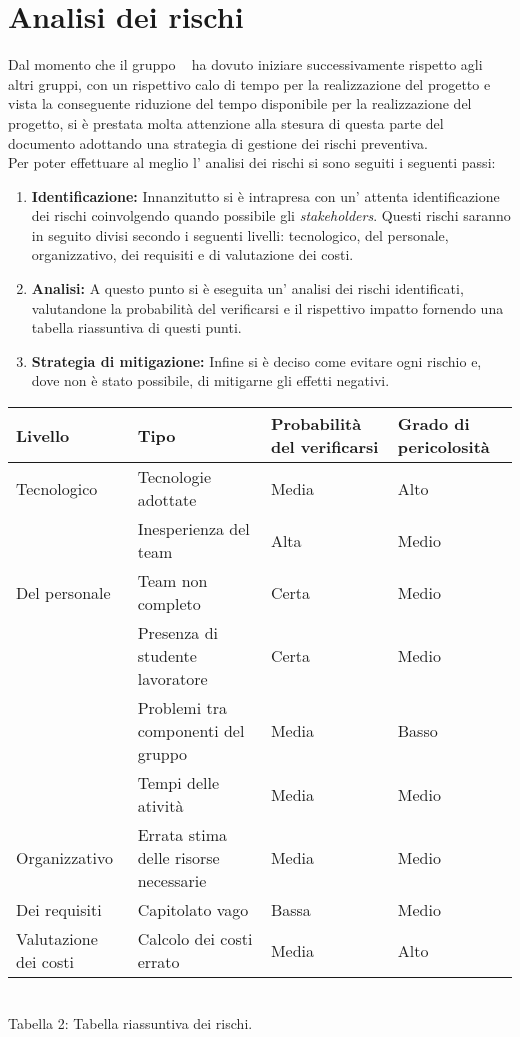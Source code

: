 \section{Analisi dei rischi}
Dal momento che il gruppo \gruppo~ ha dovuto iniziare successivamente rispetto agli altri gruppi, con un rispettivo calo di tempo per la realizzazione del progetto e vista la conseguente riduzione del tempo disponibile per la realizzazione del progetto, si è prestata molta attenzione alla stesura di questa parte del documento adottando una strategia di gestione dei rischi preventiva.\\
Per poter effettuare al meglio l' analisi dei rischi si sono seguiti i seguenti passi:
\begin{enumerate}
	\item \textbf{Identificazione: }Innanzitutto si è intrapresa con un' attenta identificazione dei rischi coinvolgendo quando possibile gli \textit{stakeholders}. Questi rischi saranno in seguito divisi secondo i seguenti livelli: tecnologico, del personale, organizzativo, dei requisiti e di valutazione dei costi.
\item \textbf{Analisi: }A questo punto si è eseguita un' analisi dei rischi identificati, valutandone la probabilità del verificarsi e il rispettivo impatto fornendo una tabella riassuntiva di questi punti.
\item \textbf{Strategia di mitigazione: }Infine si è deciso come evitare ogni rischio e, dove non è stato possibile, di mitigarne gli effetti negativi.
\end{enumerate}
\begin{center}
	\begin{tabular}{| >{\centering\arraybackslash}m{1in} | >{\centering\arraybackslash}m{1in} | >{\centering\arraybackslash}m{1in} | >{\centering\arraybackslash}m{1in} |}
		\hline
		\textbf{Livello} & \textbf{Tipo} & \textbf{Probabilità del verificarsi}& \textbf{Grado di pericolosità} \\
		\hline
		Tecnologico & Tecnologie adottate & Media & Alto\\
		\hline
		& Inesperienza del team & Alta & Medio \\		
		\cline{2-4}
		 Del personale   & Team non completo & Certa & Medio \\
		 \cline{2-4}
		& Presenza di studente lavoratore & Certa & Medio \\
		 \cline{2-4}
		 & Problemi tra componenti del gruppo & Media & Basso \\
		 \hline
		 & Tempi delle atività & Media & Medio \\
		 \cline{2-4}
		Organizzativo  & Errata stima delle risorse necessarie & Media & Medio \\
		 \hline
		 Dei requisiti & Capitolato vago & Bassa & Medio \\
		 \hline
		 Valutazione dei costi & Calcolo dei costi errato & Media & Alto \\
		 \hline
	\end{tabular}
	\\
	Tabella 2: Tabella riassuntiva dei rischi.
\end{center}
